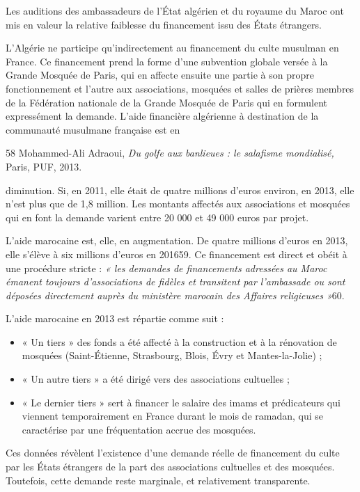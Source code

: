 Les auditions des ambassadeurs de l'État algérien et du royaume du Maroc
ont mis en valeur la relative faiblesse du financement issu des États
étrangers.

L'Algérie ne participe qu'indirectement au financement du culte musulman
en France. Ce financement prend la forme d'une subvention globale versée
à la Grande Mosquée de Paris, qui en affecte ensuite une partie à son
propre fonctionnement et l'autre aux associations, mosquées et salles de
prières membres de la Fédération nationale de la Grande Mosquée de Paris
qui en formulent expressément la demande. L'aide financière algérienne à
destination de la communauté musulmane française est en

58 Mohammed-Ali Adraoui, \emph{Du golfe aux banlieues : le salafisme
mondialisé,} Paris, PUF, 2013.



diminution. Si, en 2011, elle était de quatre millions d'euros environ,
en 2013, elle n'est plus que de 1,8 million. Les montants affectés aux
associations et mosquées qui en font la demande varient entre 20 000 et
49 000 euros par projet.

L'aide marocaine est, elle, en augmentation. De quatre millions d'euros
en 2013, elle s'élève à six millions d'euros en 201659. Ce financement
est direct et obéit à une procédure stricte : \emph{« les demandes de
financements adressées au Maroc émanent toujours d'associations de
fidèles et transitent par l'ambassade ou sont déposées directement
auprès du ministère marocain des Affaires religieuses »}60.

L'aide marocaine en 2013 est répartie comme suit :


\begin{itemize}
\item
  « Un tiers » des fonds a été affecté à la construction et à la
  rénovation de mosquées (Saint-Étienne, Strasbourg, Blois, Évry et
  Mantes-la-Jolie) ;
\item
  « Un autre tiers » a été dirigé vers des associations cultuelles ;
\item
  
  « Le dernier tiers » sert à financer le salaire des imams et
  prédicateurs qui viennent temporairement en France durant le mois de
  ramadan, qui se caractérise par une fréquentation accrue des mosquées.
  
\end{itemize}


Ces données révèlent l'existence d'une demande réelle de financement du
culte par les États étrangers de la part des associations cultuelles et
des mosquées. Toutefois, cette demande reste marginale, et relativement
transparente.

